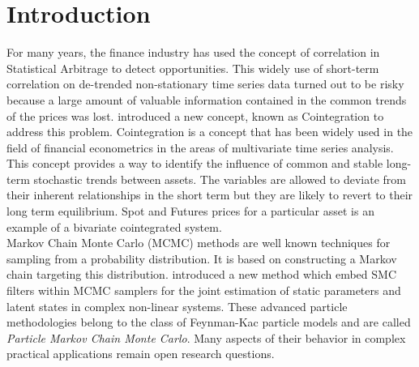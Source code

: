 \documentclass[11pt,a4,twosided,singlespacing,titlepagenumber=on]{scrreprt}
\numberwithin{equation}{chapter} %
\theoremstyle{remark}
\begin{document}
\chapter{Introduction}

For many years, the finance industry has used the concept of correlation in Statistical Arbitrage to detect opportunities. This widely use of short-term correlation on de-trended non-stationary time series data turned out to be risky because a large amount of valuable information contained in the common trends of the prices was lost. \cite{engle1987} introduced a new concept, known as Cointegration to address this problem. Cointegration is a concept that has been widely used in the field of financial econometrics in the areas of multivariate time series analysis. This concept provides a way to identify the influence of common and stable long-term stochastic trends between assets. The variables are allowed to deviate from their inherent relationships in the short term but they are likely to revert to their long term equilibrium. Spot and Futures prices for a particular asset is an example of a bivariate cointegrated system. \\


Markov Chain Monte Carlo (MCMC) methods are well known techniques for sampling from a probability distribution. It is based on constructing a Markov chain targeting this distribution. \cite{andrieu2010} introduced a new method which embed SMC filters within MCMC samplers for the joint estimation of static parameters and latent states in complex non-linear systems. These advanced particle methodologies belong to the class of Feynman-Kac particle models and are called \textit{Particle Markov Chain Monte Carlo}. Many aspects of their behavior in complex practical applications remain open research questions. \\

\end{document}
